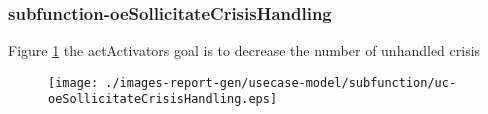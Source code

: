 \subsubsection{subfunction-oeSollicitateCrisisHandling}

\label{RE-use-case-oeSollicitateCrisisHandling}


Figure \ref{fig:lu.uni.lassy.excalibur.myproject-RE-UCD-uc-oeSollicitateCrisisHandling}
the actActivators goal is to decrease the number of unhandled crisis

\begin{figure}[htbp]
\begin{center}

\texttt{[image: ./images-report-gen/usecase-model/subfunction/uc-oeSollicitateCrisisHandling.eps]}
\end{center}
\caption[lu.uni.lassy.excalibur.myproject Use Case Diagram: uc-oeSollicitateCrisisHandling]{}
\label{fig:lu.uni.lassy.excalibur.myproject-RE-UCD-uc-oeSollicitateCrisisHandling}
\end{figure}
\vspace{0.5cm}
